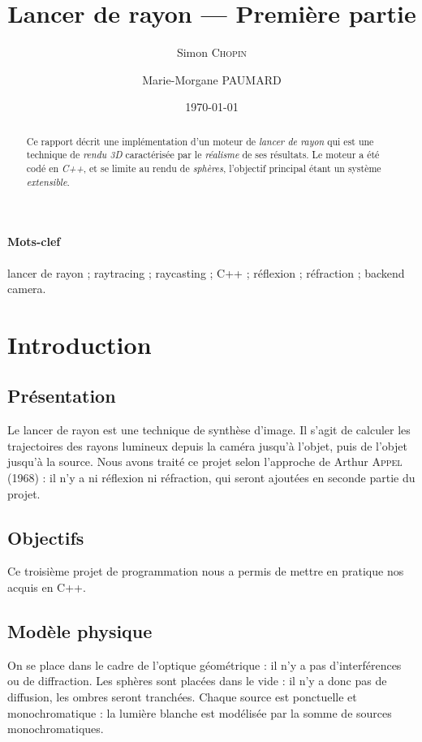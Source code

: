 \documentclass{article}
\title{Lancer de rayon — Première partie}
\author{Simon \textsc{Chopin} \and Marie-Morgane \textsc{PAUMARD}}
\date{\today}
\begin{document}
\maketitle
\tableofcontents
\begin{abstract}
    Ce rapport décrit une implémentation d'un moteur de \emph{lancer de rayon} 
    qui est une technique de \emph{rendu 3D} caractérisée par le \emph{réalisme}
    de ses résultats. Le moteur a été codé en \emph{C++}, et se limite au rendu
    de \emph{sphères}, l'objectif principal étant un système \emph{extensible}.
    
\end{abstract}

\paragraph{Mots-clef}
lancer de rayon ; raytracing ; raycasting ; C++ ; réflexion ; réfraction ;
backend camera.

\section{Introduction}
\subsection{Présentation}
Le lancer de rayon est une technique de synthèse d’image. Il s’agit de calculer
les trajectoires des rayons lumineux depuis la caméra jusqu’à l’objet, puis de
l’objet jusqu’à la source.
Nous avons traité ce projet selon l'approche de Arthur \textsc{Appel} (1968) :
il n'y a ni réflexion ni réfraction, qui seront ajoutées en seconde partie du
projet.

\subsection{Objectifs}
Ce troisième projet de programmation nous a permis de mettre en pratique nos
acquis en C++.

\subsection{Modèle physique}
On se place dans le cadre de l'optique géométrique : il n'y a pas
d'interférences ou de diffraction. Les sphères sont placées dans le vide : il
n'y a donc pas de diffusion, les ombres seront tranchées. Chaque source est
ponctuelle et monochromatique : la lumière blanche est modélisée par la somme
de sources monochromatiques.
\end{document}
